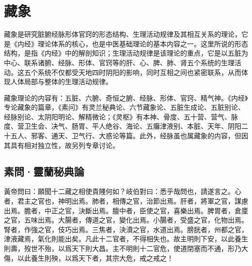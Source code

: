 \documentclass[12pt]{ctexbook}
\begin{document}
\pagestyle{main2}
\fi
\chapter{藏象}%

藏象是研究脏腑经脉形体官窍的形态结构、生理活动规律及其相互关系的理论，它是《内经》理论体系的核心，也是中医基础理论的基本内容之一。这里所说的形态结构，是指《内经》中的解剖知识；生理活动规律是该理论的重点，它是以五脏为中心、联系诸腑、经脉、形体、官窍等的肝、心、脾、肺、肾五个系统的生理活动。这五个系统不仅都受天地四时阴阳的影响，同时互相之间也紧密联系，从而体现人体局部与整体的生理活动规律。

藏象理论的内容有：五脏、六腑、奇恒之腑、经脉、形体、官窍、精气神。《内经》专论藏象的篇章，《素问》有灵兰秘典论、六节藏象论、五脏生成论、五脏别论、经脉别论、太阴阳明论、解精微论；《灵枢》有本神、骨度、五十营、营气、脉度、营卫生会、决气、肠胃、平人绝谷、海论、五癱津液别、本脏、天年、阴阳二十五人、邪客、通天、卫气行、大惑论等篇。此外，经脉虽也属藏象的内容，但因其具有相对独立性，故另列专章讨论。

\section{素問·靈蘭秘典論}%


\begin{yuanwen}
黃帝問曰：願聞十二藏之相使貴賤何如？岐伯對曰：悉乎哉問也，請遂言之。心者，君主之官也，神明出焉。肺者，相傳之官，治節出焉。肝者，將軍之官，謀慮出焉。膽者，中正之官，決斷出焉。膻中者，臣使之官，喜樂出焉。脾胃者，倉廩之官，五味出焉。大腸者，傳道之官，變化出焉。小腸者，受盛之官，化物出焉。腎者，作強之官，伎巧出焉。三焦者，決瀆之官，水道出焉。膀胱者，州都之官，津液藏焉，氣化則能出矣。凡此十二官者，不得相失也。故主明則下安，以此養生則壽，歿世不殆，以爲天下則大昌。主不明則十二官危，使道閉塞而不通，形乃大傷，以此養生則殃，以爲天下者，其宗大危，戒之戒之！
\end{yuanwen}

\end{document}
